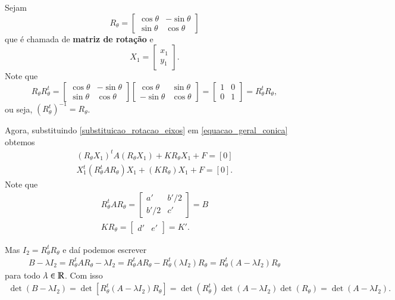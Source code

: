 Sejam
\[
  R_\theta = \begin{bmatrix}
    \cos\theta & -\sin\theta\\
    \sin\theta & \cos\theta
  \end{bmatrix}
\]
que é chamada de \textbf{matriz de rotação} e
\[
  X_1 = \begin{bmatrix}x_1\\y_1\end{bmatrix}.
\]
Note que
\[
  R_\theta R_\theta^t = \begin{bmatrix}
    \cos\theta & -\sin\theta\\
    \sin\theta & \cos\theta
  \end{bmatrix}\begin{bmatrix}
    \cos\theta & \sin\theta\\
    -\sin\theta & \cos\theta
  \end{bmatrix} = \begin{bmatrix}
    1 & 0\\
    0 & 1
  \end{bmatrix} = R_\theta^t R_\theta, 
\]
ou seja, $(R_\theta^t)^{-1} = R_\theta$.

Agora, substituindo \eqref{substituicao_rotacao_eixos} em \eqref{equacao_geral_conica} obtemos
\begin{align*}
  (R_\theta X_1)^t A (R_\theta X_1) + KR_\theta X_1 + F = [0]\\
  X_1^t(R_\theta^t A R_\theta)X_1 + (KR_\theta)X_1 + F = [0].
\end{align*}
Note que
\begin{align*}
  R_\theta^t A R_\theta = \begin{bmatrix}
    a' & b'/2\\
    b'/2 & c'
  \end{bmatrix} = B\\
  KR_\theta = \begin{bmatrix}
    d'& e'
  \end{bmatrix} = K'.
\end{align*}

Mas $I_2 = R_\theta^t R_\theta$ e daí podemos escrever
\begin{align*}
  B - \lambda I_2 = R_\theta^t A R_\theta - \lambda I_2 = R_\theta^t A R_\theta - R_\theta^t (\lambda I_2) R_\theta = R_\theta^t (A - \lambda I_2)R_\theta
\end{align*}
para todo $\lambda \in \mathbb{R}$. Com isso
\begin{align*}
  \det(B - \lambda I_2) = \det[R_\theta^t(A - \lambda I_2)R_\theta] = \det(R_\theta^t)\det(A - \lambda I_2)\det(R_\theta) = \det(A - \lambda I_2).
\end{align*}

